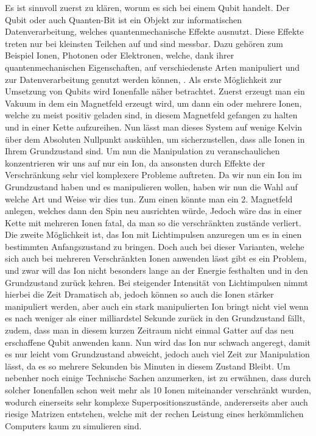 \documentclass[12pt]{report}
\begin{document}
Es ist sinnvoll zuerst zu klären, worum es sich bei einem Qubit handelt. Der Qubit oder auch Quanten-Bit ist ein Objekt zur informatischen Datenverarbeitung, welches quantenmechanische Effekte ausnutzt. Diese Effekte treten nur bei kleinsten Teilchen auf und sind messbar. Dazu gehören zum Beispiel Ionen, Photonen oder Elektronen, welche, dank ihrer quantenmechanischen Eigenschaften, auf verschiedenste Arten manipuliert und zur Datenverarbeitung genutzt werden können, . 
Als erste Möglichkeit zur Umsetzung von Qubits wird Ionenfalle näher betrachtet. Zuerst erzeugt man ein Vakuum in dem ein Magnetfeld erzeugt wird, um dann ein oder mehrere Ionen, welche zu meist positiv geladen sind, in diesem Magnetfeld gefangen zu halten und in einer Kette aufzureihen. Nun lässt man dieses System auf wenige Kelvin über dem Absoluten Nullpunkt auskühlen, um sicherzustellen, dass alle Ionen in Ihrem Grundzustand sind. Um nun die Manipulation zu veranschaulichen konzentrieren wir uns auf nur ein Ion, da ansonsten durch Effekte der Verschränkung sehr viel komplexere Probleme auftreten. Da wir nun ein Ion im Grundzustand haben und es manipulieren wollen, haben wir nun die Wahl auf welche Art und Weise wir dies tun. Zum einen könnte man ein 2. Magnetfeld anlegen, welches dann den Spin neu ausrichten würde, Jedoch wäre das in einer Kette mit mehreren Ionen fatal, da man so die verschränkten zustände verliert. Die zweite Möglichkeit ist, das Ion mit Lichtimpulsen anzuregen um es in einen bestimmten Anfangszustand zu bringen. Doch auch bei dieser Varianten, welche sich auch bei mehreren Verschränkten Ionen anwenden lässt gibt es ein Problem, und zwar will das Ion nicht besonders lange an der Energie festhalten und in den Grundzustand zurück kehren. Bei steigender Intensität von Lichtimpulsen nimmt hierbei die Zeit Dramatisch ab, jedoch können so auch die Ionen stärker manipuliert werden, aber auch ein stark manipulierten Ion bringt nicht viel wenn es nach weniger als einer milliardstel Sekunde zurück in den Grundzustand fällt, zudem, dass man in diesem kurzen Zeitraum nicht einmal Gatter auf das neu erschaffene Qubit anwenden kann. Nun wird das Ion nur schwach angeregt, damit es nur leicht vom Grundzustand abweicht, jedoch auch viel Zeit zur Manipulation lässt, da es so mehrere Sekunden bis Minuten in diesem Zustand Bleibt. Um nebenher noch einige Technische Sachen anzumerken, ist zu erwähnen, dass durch solcher Ionenfallen schon weit mehr als 10 Ionen miteinander verschränkt wurden, wodurch einerseits sehr komplexe Superpositionszustände, andererseits aber auch riesige Matrizen entstehen, welche mit der rechen Leistung eines herkömmlichen Computers kaum zu simulieren sind.  
\end{document}
